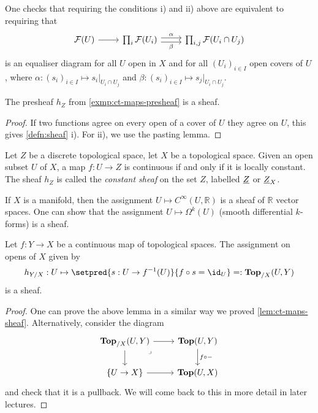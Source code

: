 \begin{rmk}\label{rmk:sheafs-as-equalizers}
    One checks that requiring the conditions i) and ii) above are equivalent to requiring that
\[\begin{tikzcd}
	{\mathcal{F}(U)} & {\prod_i\mathcal{F}(U_i)} & {\prod_{i,j}\mathcal{F}(U_i \cap U_j)}
	\arrow[from=1-1, to=1-2]
	\arrow["\alpha", shift left, from=1-2, to=1-3]
	\arrow["\beta"', shift right, from=1-2, to=1-3]
\end{tikzcd}\]
    is an equaliser diagram for all $U$ open in $X$ and for all $(U_i)_{i \in I}$ open covers of $U$ , where $\alpha: (s_i)_{i \in I} \mapsto s_i|_{U_i \cap U_j}$ and $\beta: (s_i)_{i \in I} \mapsto s_j|_{U_i \cap U_j}$.
\end{rmk}

\begin{lem} \label{lem:ct-maps-sheaf}
    The presheaf $h_Z$ from \cref{exmp:ct-maps-presheaf} is a sheaf.
\end{lem}
\begin{proof}
    If two functions agree on every open of a cover of $U$ they agree on $U$, this gives \cref{defn:sheaf} i). For ii), we use the pasting lemma.
\end{proof}

\begin{exmp}
    Let $Z$ be a discrete topological space, let $X$ be a topological space. Given an open subset $U$ of $X$, a map $f: U \to Z$ is continuous if and only if it is locally constant. The sheaf $h_Z$ is called the \emph{constant sheaf} on the set $Z$, labelled $\underline{Z}$ or $\underline{Z}_X$.
\end{exmp}

\begin{exmp}
    If $X$ is a manifold, then the assignment $U \mapsto C^\infty(U, \mathbb{R})$ is a sheaf of $\mathbb{R}$ vector spaces. One can show that the assignment $U \mapsto \Omega^k(U)$ (smooth differential $k$-forms) is a sheaf.
\end{exmp}

\begin{lem}[name=Sheaf of sections]\label{exmp:sheaf-of-sections}
    Let $f: Y \to X$ be a continuous map of topological spaces. The assignment on opens of $X$ given by 
    \[
        h_{Y/X}: U \mapsto \setpred{s: U \to f^{-1}(U) }{ f \circ s = \id_U} =: \cont[X](U, Y)
    \]
    is a sheaf.
\end{lem}
\begin{proof}
    One can prove the above lemma in a similar way we proved \cref{lem:ct-maps-sheaf}. 
    Alternatively, consider the diagram 
    \[\begin{tikzcd}
	{\cont[X](U,Y)} & {\cont(U,Y)} \\
	{\{U \to X\}} & {\cont(U,X)}
	\arrow["{f \circ -}", from=1-2, to=2-2]
	\arrow[from=1-1, to=2-1]
	\arrow[from=2-1, to=2-2]
	\arrow[from=1-1, to=1-2]
	\arrow["\lrcorner"{anchor=center, pos=0.125}, draw=none, from=1-1, to=2-2]
\end{tikzcd}\]
    and check that it is a pullback. We will come back to this in more detail in later lectures. 
\end{proof}

